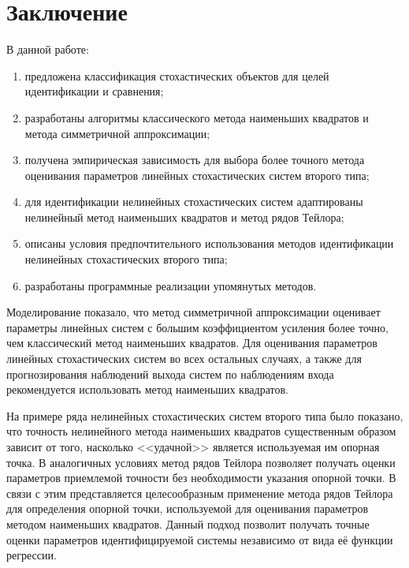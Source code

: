 \chapter*{Заключение}

В данной работе:
\begin{enumerate}
\item предложена классификация стохастических объектов для целей
  идентификации и сравнения;
\item разработаны алгоритмы классического метода наименьших квадратов и
  метода симметричной аппроксимации;
\item получена эмпирическая зависимость для выбора более точного метода
  оценивания параметров линейных стохастических систем второго типа;
\item для идентификации нелинейных стохастических
  систем адаптированы нелинейный метод наименьших квадратов и метод рядов Тейлора;
\item описаны условия предпочтительного использования
  методов идентификации нелинейных стохастических второго типа;
\item разработаны программные реализации упомянутых методов.
\end{enumerate}

Моделирование показало, что метод симметричной аппроксимации оценивает
параметры линейных систем с большим коэффициентом усиления более точно,
чем классический метод наименьших квадратов.
Для оценивания параметров линейных стохастических систем во всех остальных случаях,
а также для прогнозирования наблюдений выхода систем по наблюдениям входа
рекомендуется использовать метод наименьших квадратов.

На примере ряда нелинейных стохастических систем второго типа было показано,
что точность нелинейного метода наименьших квадратов существенным образом
зависит от того, насколько <<удачной>> является используемая им опорная точка.
В аналогичных условиях метод рядов Тейлора позволяет получать оценки параметров
приемлемой точности без необходимости указания опорной точки.
В связи с этим представляется целесообразным применение метода рядов Тейлора
для определения опорной точки, используемой для оценивания параметров методом
наименьших квадратов.
Данный подход позволит получать точные оценки параметров идентифицируемой системы
независимо от вида её функции регрессии.
